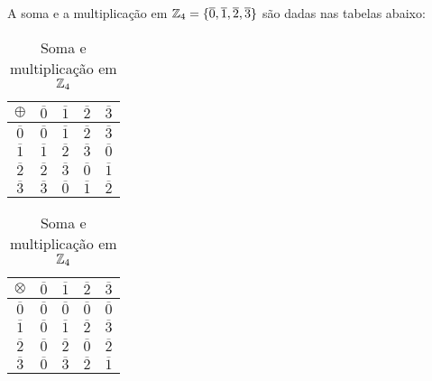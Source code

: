 \begin{exemplo}
	A soma e a multiplica{\c c}{\~a}o em $\mathbb{Z}_4 = \{\overline{0},\overline{1},\overline{2},\overline{3}\}$
	s\~ao dadas nas tabelas abaixo:
		\begin{table}[!htb]
		  \caption{Soma e multiplica\c{c}\~ao em $\mathbb{Z}_4$}
		  \begin{minipage}{.5\linewidth}
		    \centering
		 	\begin{tabular}{|c|c|c|c|c|} 
			    \hline
			    $\oplus$ & $\overline{0}$ & $\overline{1}$ & $\overline{2}$ & $\overline{3}$\T\\
			    \hline
			    $\overline{0}$ & $\overline{0}$ & $\overline{1}$ & $\overline{2}$ & $\overline{3}$\T\\
			    \hline
			    $\overline{1}$ & $\overline{1}$ & $\overline{2}$ & $\overline{3}$ & $\overline{0}$\T\\
			    \hline
			    $\overline{2}$ & $\overline{2}$ & $\overline{3}$ & $\overline{0}$ & $\overline{1}$\T\\
			    \hline
			    $\overline{3}$ & $\overline{3}$ & $\overline{0}$ & $\overline{1}$ & $\overline{2}$\T\\
			    \hline
			\end{tabular}
		  \end{minipage}
		  \begin{minipage}{.5\linewidth}
		  \centering
		    \begin{tabular}{|c|c|c|c|c|} 
		      \hline
		      $\otimes$ & $\overline{0}$ & $\overline{1}$ & $\overline{2}$ & $\overline{3}$\T\\
		      \hline
		      $\overline{0}$ & $\overline{0}$ & $\overline{0}$ & $\overline{0}$ & $\overline{0}$\T\\
		      \hline
		      $\overline{1}$ & $\overline{0}$ & $\overline{1}$ & $\overline{2}$ & $\overline{3}$\T\\
		      \hline
		      $\overline{2}$ & $\overline{0}$ & $\overline{2}$ & $\overline{0}$ & $\overline{2}$\T\\
		      \hline
		      $\overline{3}$ & $\overline{0}$ & $\overline{3}$ & $\overline{2}$ & $\overline{1}$\T\\
		      \hline
			\end{tabular}
		\end{minipage}
	\end{table}
\end{exemplo}


